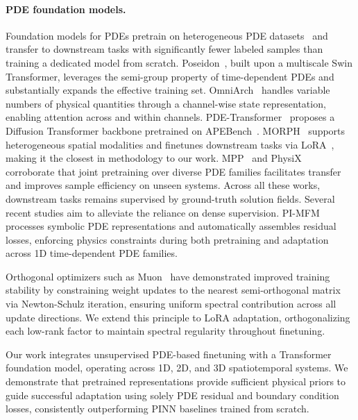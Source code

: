 \documentclass{article}
\begin{document}
\paragraph{PDE foundation models.}
Foundation models for PDEs pretrain on heterogeneous PDE datasets~\cite{takamoto2022pdebench,ohana2024thewell,koehler2024apebench} and transfer to downstream tasks with significantly fewer labeled samples than training a dedicated model from scratch. Poseidon~\cite{herde2024poseidon}, built upon a multiscale Swin Transformer, leverages the semi-group property of time-dependent PDEs and substantially expands the effective training set.  OmniArch~\cite{chen2025omniarch} handles variable numbers of physical quantities through a channel-wise state representation, enabling attention across and within channels. PDE-Transformer~\cite{holzschuh2025pdetransformer} proposes a Diffusion Transformer backbone pretrained on APEBench~\cite{koehler2024apebench}. MORPH~\cite{rautela2025morph} supports heterogeneous spatial modalities and finetunes downstream tasks via LoRA~\cite{hu2022lora}, making it the closest in methodology to our work. MPP~\cite{mccabe2024mpp} and PhysiX~\cite{nguyen2025physix} corroborate that joint pretraining over diverse PDE families facilitates transfer and improves sample efficiency on unseen systems. Across all these works, downstream tasks remains supervised by ground-truth solution fields. Several recent studies aim to alleviate the reliance on dense supervision. PI-MFM~\cite{zhu2025pimfm} processes symbolic PDE representations and automatically assembles residual losses, enforcing physics constraints during both pretraining and adaptation across 1D time-dependent PDE families. 

Orthogonal optimizers such as Muon~\cite{jordan2024muon} have demonstrated improved training stability by constraining weight updates to the nearest semi-orthogonal matrix via Newton-Schulz iteration, ensuring uniform spectral contribution across all update directions. We extend this principle to LoRA adaptation, orthogonalizing each low-rank factor to maintain spectral regularity throughout finetuning.

Our work integrates unsupervised PDE-based finetuning with a Transformer foundation model, operating across 1D, 2D, and 3D spatiotemporal systems. We demonstrate that pretrained representations provide sufficient physical priors to guide successful adaptation using solely PDE residual and boundary condition losses, consistently outperforming PINN baselines trained from scratch.
\end{document}
